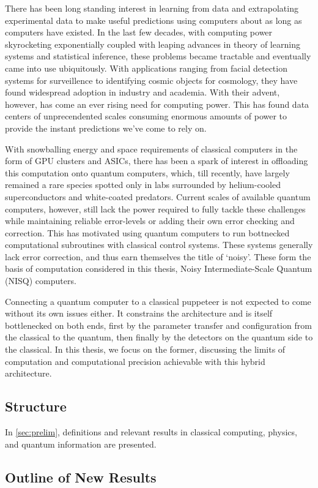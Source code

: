 
There has been long standing interest in learning from data and extrapolating
experimental data to make useful predictions using computers about as long as
computers have existed. In the last few decades, with computing power
skyrocketing exponentially coupled with leaping advances in theory of learning
systems and statistical inference, these problems became tractable and
eventually came into use ubiquitously. With applications ranging from facial
detection systems for surveillence to identifying cosmic objects for cosmology,
they have found widespread adoption in industry and academia. With their advent,
however, has come an ever rising need for computing power. This has found data
centers of unprecendented scales consuming enormous amounts of power to provide
the instant predictions we've come to rely on.

With snowballing energy and space requirements of classical computers in the
form of GPU clusters and ASICs, there has been a spark of interest in offloading
this computation onto quantum computers, which, till recently, have largely
remained a rare species spotted only in labs surrounded by helium-cooled
superconductors and white-coated predators. Current scales of available quantum
computers, however, still lack the power required to fully tackle these
challenges while maintaining reliable error-levels or adding their own error
checking and correction. This has motivated using quantum computers to run
bottnecked computational subroutines with classical control systems. These
systems generally lack error correction, and thus earn themselves the title of
`noisy'. These form the basis of computation considered in this thesis, Noisy
Intermediate-Scale Quantum (NISQ) computers.

Connecting a quantum computer to a classical puppeteer is not expected to come
without its own issues either. It constrains the architecture and is itself
bottlenecked on both ends, first by the parameter transfer and configuration
from the classical to the quantum, then finally by the detectors on the quantum
side to the classical. In this thesis, we focus on the former, discussing the
limits of computation and computational precision achievable with this hybrid
architecture.

\subsection{Structure}
In \autoref{sec:prelim}, definitions and relevant results in classical
computing, physics, and quantum information are presented. 

\subsection{Outline of New Results}
